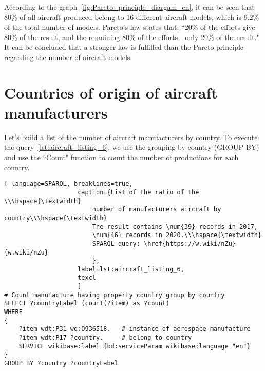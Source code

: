 \begin{figure*}[h]

    \setlength{\fboxsep}{0pt}%
    \setlength{\fboxrule}{1pt}%

	\caption{Percentage of the number of aircraft models produced by all airlines to the total number of aircraft manufactured for all time, 2020.}%
    \label{fig:Pareto_principle_diargam_en}%
\end{figure*}

According to the graph~\ref{fig:Pareto_principle_diargam_en}, it can be seen that 80\% of all aircraft produced belong to 16 different aircraft 
models, which is 9.2\% of the total number of models. Pareto's law states that: ``20\% of the efforts give 80\% of the result, and the remaining 80\%
 of the efforts - only 20\% of the result." It can be concluded that a stronger law is fulfilled than the Pareto principle regarding the number 
 of aircraft models.


\section{Countries of origin of aircraft manufacturers}

Let's build a list of the number of aircraft manufacturers by country. To execute the query~\ref{lst:aircraft_listing_6}, we use the grouping 
by country (GROUP BY) and use the ``Count" function to count the number of productions for each country.

\begin{lstlisting}[ language=SPARQL, breaklines=true, 
                    caption={List of the ratio of the \\\hspace{\textwidth} 
						number of manufacturers aircraft by country\\\hspace{\textwidth}
                        The result contains \num{39} records in 2017, 
                        \num{46} records in 2020.\\\hspace{\textwidth}
                        SPARQL query: \href{https://w.wiki/nZu}{w.wiki/nZu}
                        },
                    label=lst:aircraft_listing_6,
                    texcl 
                    ]
# Count manufacture having property country group by country
SELECT ?countryLabel (count(?item) as ?count)
WHERE
{
    ?item wdt:P31 wd:Q936518.   # instance of aerospace manufacture
    ?item wdt:P17 ?country.     # belong to country
    SERVICE wikibase:label {bd:serviceParam wikibase:language "en"}
}
GROUP BY ?country ?countryLabel 
\end{lstlisting}

